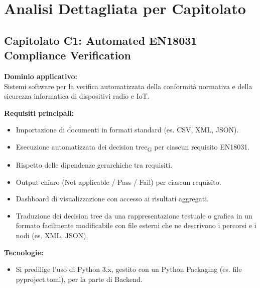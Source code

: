 \section{Analisi Dettagliata per Capitolato}

\subsection{Capitolato C1: {Automated EN18031 Compliance Verification} }

\textbf{Dominio applicativo:} \\
{Sistemi software per la verifica automatizzata della conformità normativa e della sicurezza informatica di dispositivi radio e IoT.}

\vspace{0.3cm}
\textbf{Requisiti principali:}
\begin{itemize}
	\item {Importazione di documenti in formati standard (es. CSV, XML, JSON).}
	\item {Esecuzione automatizzata dei decision tree\textsubscript{G} per ciascun requisito EN18031.}
    \item Rispetto delle dipendenze gerarchiche tra requisiti.
    \item Output chiaro (Not applicable / Pass / Fail) per ciascun requisito.
    \item Dashboard di visualizzazione con accesso ai risultati aggregati.
    \item Traduzione dei decision tree da una rappresentazione testuale o grafica in
un formato facilmente modificabile con file esterni che ne descrivono i
percorsi e i nodi (es. XML, JSON).
\end{itemize}

\vspace{0.3cm}
\textbf{Tecnologie:}
\begin{itemize}
	\item {Si predilige l’uso di Python 3.x, gestito con un
Python Packaging (es. file pyproject.toml), per la parte di Backend.}
\end{itemize}

